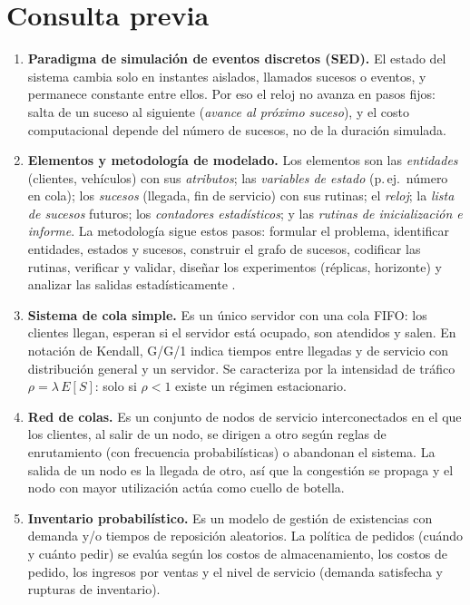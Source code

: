 \documentclass[11pt,a4paper]{article}
\begin{document}
\section{Consulta previa}
\begin{enumerate}[label=\arabic*.]
 \item \textbf{Paradigma de simulación de eventos discretos (SED).} El estado del sistema
 cambia solo en instantes aislados, llamados sucesos o eventos, y permanece constante entre
 ellos. Por eso el reloj no avanza en pasos fijos: salta de un suceso al siguiente
 (\emph{avance al próximo suceso}), y el costo computacional depende del número de sucesos,
 no de la duración simulada.
 \item \textbf{Elementos y metodología de modelado.} Los elementos son las
 \emph{entidades} (clientes, vehículos) con sus \emph{atributos}; las \emph{variables de
 estado} (p.\,ej.\ número en cola); los \emph{sucesos} (llegada, fin de servicio) con sus
 rutinas; el \emph{reloj}; la \emph{lista de sucesos} futuros; los \emph{contadores
 estadísticos}; y las \emph{rutinas de inicialización e informe}. La metodología sigue
 estos pasos: formular el problema, identificar entidades, estados y sucesos, construir el
 grafo de sucesos, codificar las rutinas, verificar y validar, diseñar los experimentos
 (réplicas, horizonte) y analizar las salidas estadísticamente \cite{rios2008}.
 \item \textbf{Sistema de cola simple.} Es un único servidor con una cola FIFO: los
 clientes llegan, esperan si el servidor está ocupado, son atendidos y salen. En notación
 de Kendall, G/G/1 indica tiempos entre llegadas y de servicio con distribución general y un
 servidor. Se caracteriza por la intensidad de tráfico $\rho=\lambda\,E[S]$: solo si
 $\rho<1$ existe un régimen estacionario.
 \item \textbf{Red de colas.} Es un conjunto de nodos de servicio interconectados en el que
 los clientes, al salir de un nodo, se dirigen a otro según reglas de enrutamiento (con
 frecuencia probabilísticas) o abandonan el sistema. La salida de un nodo es la llegada de
 otro, así que la congestión se propaga y el nodo con mayor utilización actúa como cuello
 de botella.
 \item \textbf{Inventario probabilístico.} Es un modelo de gestión de existencias con
 demanda y/o tiempos de reposición aleatorios. La política de pedidos (cuándo y cuánto
 pedir) se evalúa según los costos de almacenamiento, los costos de pedido, los ingresos por
 ventas y el nivel de servicio (demanda satisfecha y rupturas de inventario).

\end{enumerate}
\end{document}
